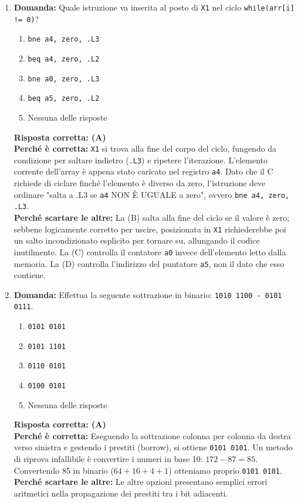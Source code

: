 \documentclass[12pt, a4paper]{article}
\begin{document}
\begin{enumerate}
    \item \textbf{Domanda:} Quale istruzione va inserita al posto di \texttt{X1} nel ciclo \texttt{while(arr[i] != 0)}?
    \begin{enumerate}[label=(\Alph*)]
        \item \texttt{bne a4, zero, .L3}
        \item \texttt{beq a4, zero, .L2}
        \item \texttt{bne a0, zero, .L3}
        \item \texttt{beq a5, zero, .L2}
        \item Nessuna delle risposte
    \end{enumerate}
    \textbf{Risposta corretta: (A)} \\
    \textbf{Perché è corretta:} \texttt{X1} si trova alla fine del corpo del ciclo, fungendo da condizione per saltare indietro (\texttt{.L3}) e ripetere l'iterazione. L'elemento corrente dell'array è appena stato caricato nel registro \texttt{a4}. Dato che il C richiede di ciclare finché l'elemento è diverso da zero, l'istruzione deve ordinare "salta a .L3 se \texttt{a4} NON È UGUALE a zero", ovvero \texttt{bne a4, zero, .L3}. \\
    \textbf{Perché scartare le altre:} La (B) salta alla fine del ciclo se il valore è zero; sebbene logicamente corretto per uscire, posizionata in \texttt{X1} richiederebbe poi un salto incondizionato esplicito per tornare su, allungando il codice inutilmente. La (C) controlla il contatore \texttt{a0} invece dell'elemento letto dalla memoria. La (D) controlla l'indirizzo del puntatore \texttt{a5}, non il dato che esso contiene.

    \item \textbf{Domanda:} Effettua la seguente sottrazione in binario: \texttt{1010 1100 - 0101 0111}.
    \begin{enumerate}[label=(\Alph*)]
        \item \texttt{0101 0101}
        \item \texttt{0101 1101}
        \item \texttt{0110 0101}
        \item \texttt{0100 0101}
        \item Nessuna delle risposte
    \end{enumerate}
    \textbf{Risposta corretta: (A)} \\
    \textbf{Perché è corretta:} Eseguendo la sottrazione colonna per colonna da destra verso sinistra e gestendo i prestiti (borrow), si ottiene \texttt{0101 0101}. Un metodo di riprova infallibile è convertire i numeri in base 10: $172 - 87 = 85$. Convertendo 85 in binario ($64 + 16 + 4 + 1$) otteniamo proprio \texttt{0101 0101}. \\
    \textbf{Perché scartare le altre:} Le altre opzioni presentano semplici errori aritmetici nella propagazione dei prestiti tra i bit adiacenti.


\end{enumerate}
\end{document}
